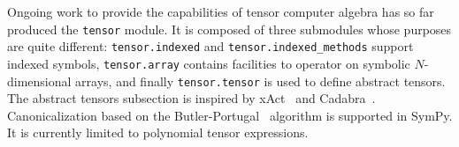 Ongoing work to provide the capabilities of tensor computer algebra has so far
produced the \verb|tensor| module.  It is composed of three
submodules whose purposes are quite different: \verb|tensor.indexed| and
\verb|tensor.indexed_methods| support indexed symbols,
\verb|tensor.array| contains facilities to operator on symbolic $N$-dimensional
arrays, and finally \verb|tensor.tensor| is used to define abstract tensors.
The abstract tensors subsection
is inspired by xAct~\cite{xAct} and Cadabra~\cite{Peeters2007cadabra}.
Canonicalization based on the Butler-Portugal~\cite{ManssurPortugal1999}
algorithm is supported in SymPy.  It is currently limited to polynomial tensor
expressions.
